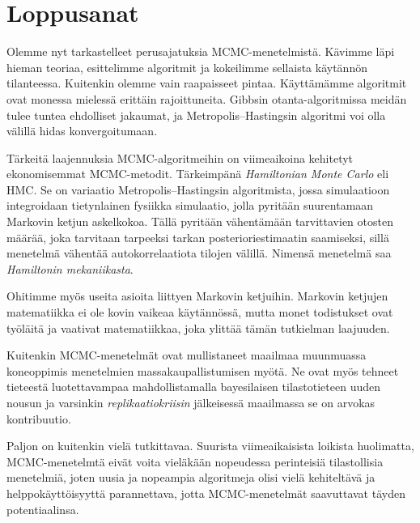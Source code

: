 \chapter{Loppusanat}

Olemme nyt tarkastelleet perusajatuksia MCMC-menetelmistä. Kävimme läpi hieman teoriaa, esittelimme algoritmit ja kokeilimme sellaista käytännön tilanteessa. Kuitenkin olemme vain raapaisseet pintaa. Käyttämämme algoritmit ovat monessa mielessä erittäin rajoittuneita. Gibbsin otanta-algoritmissa meidän tulee tuntea ehdolliset jakaumat, ja Metropolis--Hastingsin algoritmi voi olla välillä hidas konvergoitumaan.

Tärkeitä laajennuksia MCMC-algoritmeihin on viimeaikoina kehitetyt ekonomisemmat MCMC-metodit. Tärkeimpänä \textit{Hamiltonian Monte Carlo} eli HMC. Se on variaatio Metropolis--Hastingsin algoritmista, jossa simulaatioon integroidaan tietynlainen fysiikka simulaatio, jolla pyritään suurentamaan Markovin ketjun askelkokoa. Tällä pyritään vähentämään tarvittavien otosten määrää, joka tarvitaan tarpeeksi tarkan posterioriestimaatin saamiseksi, sillä menetelmä vähentää autokorrelaatiota tilojen välillä. Nimensä menetelmä saa \emph{Hamiltonin mekaniikasta}.

Ohitimme myös useita asioita liittyen Markovin ketjuihin. Markovin ketjujen matematiikka ei ole kovin vaikeaa käytännössä, mutta monet todistukset ovat työläitä ja vaativat matematiikkaa, joka ylittää tämän tutkielman laajuuden.

Kuitenkin MCMC-menetelmät ovat mullistaneet maailmaa muunmuassa koneoppimis menetelmien massakaupallistumisen myötä. Ne ovat myös tehneet tieteestä luotettavampaa mahdollistamalla bayesilaisen tilastotieteen uuden nousun ja varsinkin \emph{replikaatiokriisin} jälkeisessä maailmassa se on arvokas kontribuutio.

Paljon on kuitenkin vielä tutkittavaa. Suurista viimeaikaisista loikista huolimatta, MCMC-menetelmtä eivät voita vieläkään nopeudessa perinteisiä tilastollisia menetelmiä, joten uusia ja nopeampia algoritmeja olisi vielä kehiteltävä ja helppokäyttöisyyttä parannettava, jotta MCMC-menetelmät saavuttavat täyden potentiaalinsa.
